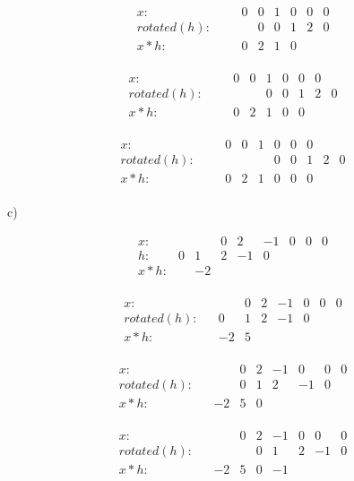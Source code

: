 \documentclass[11pt]{article}
\begin{document}
\[
\begin{array}{ccccccccccc}
x: & & & 0 & 0 & 1 &0 &0 &0  \\
rotated(h): &  &  & & 0 &0 &1 &2 &0  \\
x*h: & & & 0 &2 &1 & 0& &  \\
\end{array}
\]

\[
\begin{array}{ccccccccccc}
x: & & & 0 & 0 & 1 &0 &0 &0  \\
rotated(h): &  &  & &  &0 &0 &1 &2 &0  \\
x*h: & & & 0 &2 &1 & 0&0 &  \\
\end{array}
\]

\[
\begin{array}{ccccccccccc}
x: & & & 0 & 0 & 1 &0 &0 &0  \\
rotated(h): &  &  & &  & &0 &0 &1 &2 &0 \\
x*h: & & & 0 &2 &1 & 0&0 &0  \\
\end{array}
\]

c)

\[
\begin{array}{ccccccccccc}
x: & & & 0& 2& -1&0 &0 &0 \\
h: & 0& 1&2 &-1 &0 & \\
x*h: & & -2& & & & & \\
\end{array}
\]

\[
\begin{array}{ccccccccccc}
x: & & & 0& 2& -1&0 &0 &0 \\
rotated(h): & & 0&1 &2 &-1 &0 \\
x*h: & & -2&5 & & & & \\
\end{array}
\]

\[
\begin{array}{ccccccccccc}
x: & & & 0& 2& -1&0 &0 &0 \\
rotated(h): & & &0 &1 &2 &-1&0 \\
x*h: & & -2&5 & 0& & & \\
\end{array}
\]

\[
\begin{array}{ccccccccccc}
x: & & & 0& 2& -1&0 &0 &0 \\
rotated(h): & & & &0 &1 &2&-1 &0 \\
x*h: & & -2&5 & 0& -1& & \\
\end{array}
\]
\end{document}
